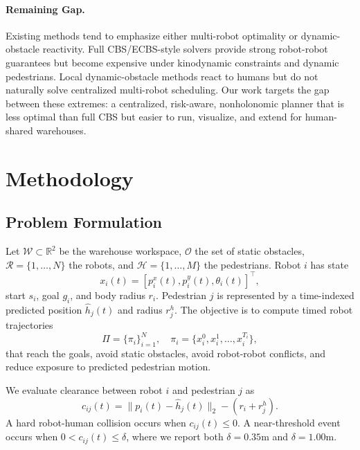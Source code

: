 \documentclass[10pt,twocolumn,letterpaper]{article}
\begin{document}
\paragraph{Remaining Gap.}
Existing methods tend to emphasize either multi-robot optimality or dynamic-obstacle reactivity. Full CBS/ECBS-style solvers provide strong robot-robot guarantees but become expensive under kinodynamic constraints and dynamic pedestrians. Local dynamic-obstacle methods react to humans but do not naturally solve centralized multi-robot scheduling. Our work targets the gap between these extremes: a centralized, risk-aware, nonholonomic planner that is less optimal than full CBS but easier to run, visualize, and extend for human-shared warehouses.

\section{Methodology}
\subsection{Problem Formulation}
Let $\mathcal{W} \subset \mathbb{R}^2$ be the warehouse workspace, $\mathcal{O}$ the set of static obstacles, $\mathcal{R}=\{1,\ldots,N\}$ the robots, and $\mathcal{H}=\{1,\ldots,M\}$ the pedestrians. Robot $i$ has state
\begin{equation}
    x_i(t) = [p^x_i(t), p^y_i(t), \theta_i(t)]^\top,
\end{equation}
start $s_i$, goal $g_i$, and body radius $r_i$. Pedestrian $j$ is represented by a time-indexed predicted position $\hat{h}_j(t)$ and radius $r^h_j$. The objective is to compute timed robot trajectories
\begin{equation}
    \Pi = \{\pi_i\}_{i=1}^{N}, \quad
    \pi_i = \{x_i^0, x_i^1, \ldots, x_i^{T_i}\},
\end{equation}
that reach the goals, avoid static obstacles, avoid robot-robot conflicts, and reduce exposure to predicted pedestrian motion.

We evaluate clearance between robot $i$ and pedestrian $j$ as
\begin{equation}
    c_{ij}(t) = \|p_i(t) - \hat{h}_j(t)\|_2 - (r_i + r^h_j).
\end{equation}
A hard robot-human collision occurs when $c_{ij}(t) \leq 0$. A near-threshold event occurs when $0 < c_{ij}(t) \leq \delta$, where we report both $\delta=0.35$m and $\delta=1.00$m.
\end{document}
